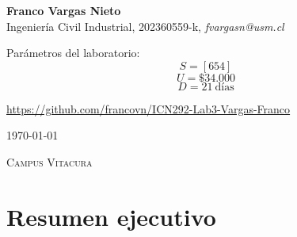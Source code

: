 \documentclass[12pt,a4paper]{article}
\begin{document}
\begin{titlepage}
\vspace{0.65cm}



\begin{center}

\textbf{Franco Vargas Nieto}\\

{\small
Ingeniería Civil Industrial, 202360559-k,
\textit{fvargasn@usm.cl}
}

\vspace{1cm} 

Parámetros del laboratorio:
\[S = [\text{654}]\]
\[ U = \$34.000\]
\[D = 21\ \text{días}\]

\vspace{1cm} 

\url{https://github.com/francovn/ICN292-Lab3-Vargas-Franco} 

\end{center}


\vfill



\begin{center}

\textsc{\monthyeardate\today}

\vspace{0.6cm}

{\small\textsc{Campus Vitacura}}

\vspace{1cm}

\end{center}

\end{titlepage}

\newpage

\section{Resumen ejecutivo}
\end{document}
